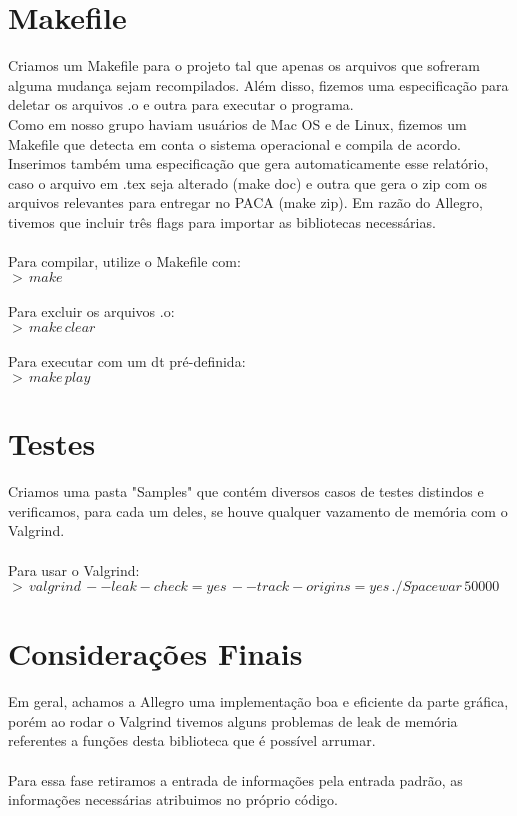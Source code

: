 \documentclass{article}
\begin{document}
\section{Makefile}
Criamos um Makefile para o projeto tal que apenas os arquivos que sofreram alguma mudança sejam recompilados. Além disso, fizemos uma especificação para deletar os arquivos .o e outra para executar o programa. \\
Como em nosso grupo haviam usuários de Mac OS e de Linux, fizemos um Makefile que detecta em conta o sistema operacional e compila de acordo.
Inserimos também uma especificação que gera automaticamente esse relatório, caso o arquivo em .tex seja alterado (make doc) e outra que gera o zip com os arquivos relevantes para entregar no PACA (make zip).
Em razão do Allegro, tivemos que incluir três flags para importar as bibliotecas necessárias. \\ \\
Para compilar, utilize o Makefile com:
\\
\indent $>\,make$ \\ \\
Para excluir os arquivos .o:
\\
\indent $>\,make\,clear$ \\ \\
Para executar com um dt pré-definida:
\\
\indent $>\,make\,play$


\section{Testes}
Criamos uma pasta "Samples" que contém diversos casos de testes distindos e verificamos, para cada um deles, se houve qualquer vazamento de memória com o Valgrind. \\ \\
Para usar o Valgrind:
\\
\indent $>\,valgrind\,--leak-check=yes\,--track-origins=yes\,./Spacewar\,50000$

\section{Considerações Finais}
Em geral, achamos a Allegro uma implementação boa e eficiente da parte gráfica, porém ao rodar o Valgrind tivemos alguns problemas de leak de memória referentes a
funções desta biblioteca que é possível arrumar. \\
\\
Para essa fase retiramos a entrada de informações pela entrada padrão, as informações necessárias atribuimos no próprio código.
\end{document}
